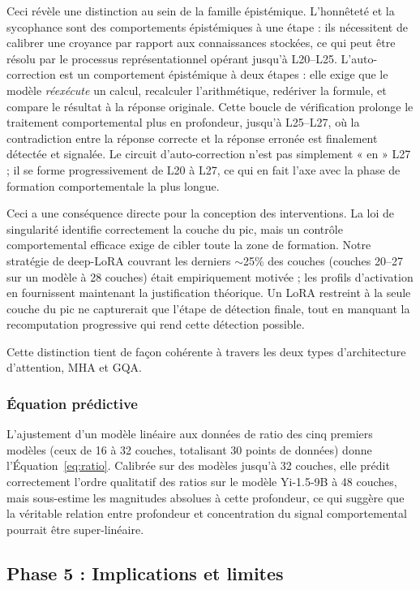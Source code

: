 \documentclass[11pt,a4paper]{article}
\begin{document}
Ceci révèle une distinction au sein de la famille épistémique. L'honnêteté et la sycophance sont des comportements épistémiques à une étape : ils nécessitent de calibrer une croyance par rapport aux connaissances stockées, ce qui peut être résolu par le processus représentationnel opérant jusqu'à L20--L25. L'auto-correction est un comportement épistémique à deux étapes : elle exige que le modèle \emph{réexécute} un calcul, recalculer l'arithmétique, redériver la formule, et compare le résultat à la réponse originale. Cette boucle de vérification prolonge le traitement comportemental plus en profondeur, jusqu'à L25--L27, où la contradiction entre la réponse correcte et la réponse erronée est finalement détectée et signalée. Le circuit d'auto-correction n'est pas simplement « en » L27 ; il se forme progressivement de L20 à L27, ce qui en fait l'axe avec la phase de formation comportementale la plus longue.

Ceci a une conséquence directe pour la conception des interventions. La loi de singularité identifie correctement la couche du pic, mais un contrôle comportemental efficace exige de cibler toute la zone de formation. Notre stratégie de deep-LoRA couvrant les derniers $\sim$25\% des couches (couches 20--27 sur un modèle à 28 couches) était empiriquement motivée ; les profils d'activation en fournissent maintenant la justification théorique. Un LoRA restreint à la seule couche du pic ne capturerait que l'étape de détection finale, tout en manquant la recomputation progressive qui rend cette détection possible.

Cette distinction tient de façon cohérente à travers les deux types d'architecture d'attention, MHA et GQA.

\subsubsection{Équation prédictive}

L'ajustement d'un modèle linéaire aux données de ratio des cinq premiers modèles (ceux de 16 à 32 couches, totalisant 30 points de données) donne l'Équation~\ref{eq:ratio}. Calibrée sur des modèles jusqu'à 32 couches, elle prédit correctement l'ordre qualitatif des ratios sur le modèle Yi-1.5-9B à 48 couches, mais sous-estime les magnitudes absolues à cette profondeur, ce qui suggère que la véritable relation entre profondeur et concentration du signal comportemental pourrait être super-linéaire.

\subsection{Phase 5 : Implications et limites}
\end{document}
